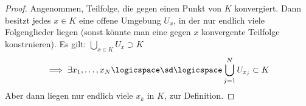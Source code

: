 \begin{proof}
    Angenommen, \tnexists Teilfolge, die gegen einen Punkt von \( K \) konvergiert. Dann besitzt jedes \( x\in K \) eine offene Umgebung \( U_x \), in der nur endlich viele Folgenglieder liegen (sonst könnte man eine gegen \( x \) konvergente Teilfolge konstruieren). Es gilt: \( \bigcup_{x\in K}U_x\supset K \)
    \begin{align*}
        \implies \exists x_1,\ldots, x_N\logicspace\text{\sd} \logicspace \bigcup_{j=1}^{N}U_{x_j}\subset K   
    \end{align*}
    Aber dann liegen nur endlich viele \( x_k \) in \( K \), \contra zur Definition.
    
\end{proof}




